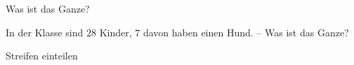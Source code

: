 \setcounter{aufgabe}{11}

\begin{aufgabe}{Was ist das Ganze?}
\begin{teile}
\teil In der Klasse sind $28$ Kinder, $7$ davon haben einen Hund. – Was ist das Ganze?
\end{teile}
\end{aufgabe}

\begin{aufgabe}{Streifen einteilen}
\end{aufgabe}

